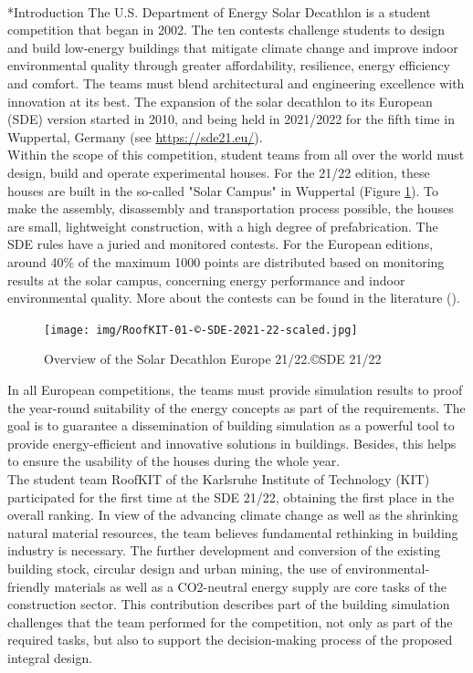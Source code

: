 \documentclass[twocolumn, a4paper,10pt]{article}
\makeatletter
\renewcommand\section{\@startsection{section}{1}{\z@}{3pt}{3pt}{\normalfont\large\bfseries}}
\makeatother
\begin{document}
\section*{Introduction}
The U.S. Department of Energy\textsuperscript{\textregistered} Solar Decathlon is a student competition that began in 2002. The ten contests challenge students to design and build low-energy buildings that mitigate climate change and improve indoor environmental quality through greater affordability, resilience, energy efficiency and comfort. The teams must blend architectural and engineering excellence with innovation at its best. The expansion of the solar decathlon to its European (SDE) version started in 2010, and being held in 2021/2022 for the fifth time in Wuppertal, Germany (see \textcolor{blue}{\url{https://sde21.eu/}}).\\
Within the scope of this competition, student teams from all over the world must design, build and operate experimental houses. For the 21/22 edition, these houses are built in the so-called "Solar Campus" in Wuppertal (Figure \ref{fig:SDE}). To make the assembly, disassembly and transportation process possible, the houses are small, lightweight construction, with a high degree of prefabrication. The SDE rules have a juried and monitored contests. For the European editions, around 40\% of the maximum 1000 points are distributed based on monitoring results at the solar campus, concerning energy performance and indoor environmental quality. More about the contests can be found in the literature (\citet{voss2021}).

\begin{figure}[H]
\centering
\texttt{[image: img/RoofKIT-01-©-SDE-2021-22-scaled.jpg]}
\vspace{2pt} 
\caption{Overview of the Solar Decathlon Europe 21/22.\copyright SDE 21/22}
\label{fig:SDE}
\end{figure}
\vspace{-2pt}

In all European competitions, the teams must provide simulation results to proof the year-round suitability of the energy concepts as part of the requirements. The goal is to guarantee a dissemination of building simulation as a powerful tool to provide energy-efficient and innovative solutions in buildings. Besides, this helps to ensure the usability of the houses during the whole year. \\
The student team RoofKIT of the Karlsruhe Institute of Technology (KIT) participated for the first time at the SDE 21/22, obtaining the first place in the overall ranking. In view of the advancing climate change as well as the shrinking natural material resources, the team believes fundamental rethinking in building industry is necessary. The further development and conversion of the existing building stock, circular design and urban mining, the use of environmental-friendly materials as well as a CO2-neutral energy supply are core tasks of the construction sector. This contribution describes part of the building simulation challenges that the team performed for the competition, not only as part of the required tasks, but also to support the decision-making process of the proposed integral design.
\end{document}
